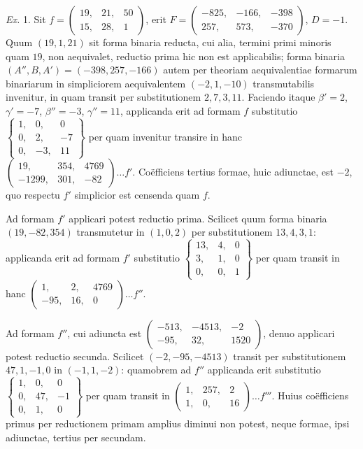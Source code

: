\emph{Ex.} 1. Sit \(f=\left(\begin{smallmatrix}19,&21,&50\\15,&28,&1\end{smallmatrix}\right)\), erit \(F=\left(\begin{smallmatrix}-825,&-166,&-398\\257,&573,&-370\end{smallmatrix}\right)\), \(D=-1\). Quum \((19,1,21)\) sit forma binaria reducta, cui alia, termini primi minoris quam \(19\), non aequivalet, reductio prima hic non est applicabilis; forma binaria
\((A'',B,A')=(-398,257,-166)\) autem per theoriam aequivalentiae formarum binariarum in simpliciorem aequivalentem \((-2,1,-10)\) transmutabilis invenitur, in quam transit per substitutionem \(2,7,3,11\). Faciendo itaque \(\beta'=2\), \(\gamma'=-7\), \(\beta''=-3\), \(\gamma''=11\), applicanda erit ad formam \(f\) substitutio \(\left\{\begin{smallmatrix}1,&0,&0\\0,&2,&-7\\0,&-3,&11\end{smallmatrix}\right\}\) per quam invenitur transire in hanc \(\left(\begin{smallmatrix}19,&354,&4769\\-1299,&301,&-82\end{smallmatrix}\right)\ldots f'\). Co\"efficiens tertius formae, huic adiunctae, est \(-2\), quo respectu \(f'\) simplicior est censenda quam \(f\).

Ad formam \(f'\) applicari potest reductio prima. Scilicet quum forma binaria \((19,-82,354)\) transmutetur in \((1,0,2)\) per substitutionem \(13,4,3,1\): applicanda erit ad formam \(f'\) substitutio \(\left\{\begin{smallmatrix}13,&4,&0\\3,&1,&0\\0,&0,&1\end{smallmatrix}\right\}\) per quam transit in hanc \(\left(\begin{smallmatrix}1,&2,&4769\\-95,&16,&0\end{smallmatrix}\right)\ldots f''\).

Ad formam \(f''\), cui adiuncta est \(\left(\begin{smallmatrix}-513,&-4513,&-2\\-95,&32,&1520\end{smallmatrix}\right)\), denuo applicari potest reductio secunda. Scilicet \((-2,-95,-4513)\) transit per substitutionem \(47,1,-1,0\) in \((-1,1,-2)\): quamobrem ad \(f''\) applicanda erit substitutio \(\left\{\begin{smallmatrix}1,&0,&0\\0,&47,&-1\\0,&1,&0\end{smallmatrix}\right\}\) per quam transit in \(\left(\begin{smallmatrix}1,&257,&2\\1,&0,&16\end{smallmatrix}\right)\ldots f'''\). Huius co\"efficiens primus per reductionem primam amplius diminui non potest, neque formae, ipsi adiunctae, tertius per secundam.

